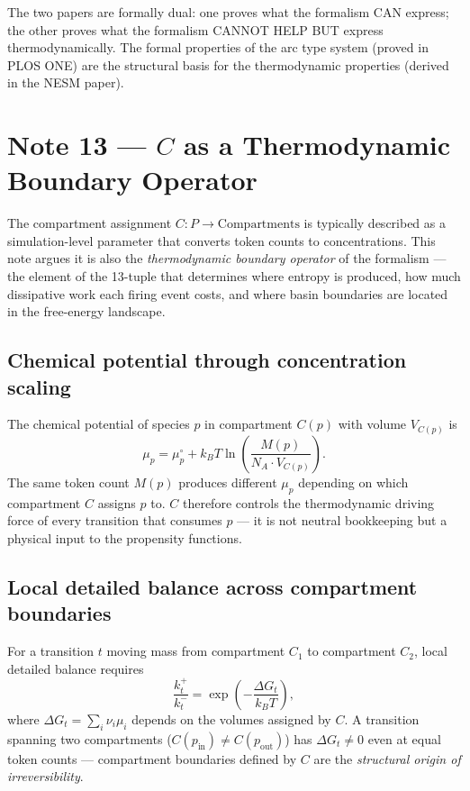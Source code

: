 \documentclass[11pt,a4paper]{article}
\begin{document}
The two papers are formally dual: one proves what the formalism CAN express;
the other proves what the formalism CANNOT HELP BUT express thermodynamically.
The formal properties of the arc type system (proved in PLOS ONE) are the
structural basis for the thermodynamic properties (derived in the NESM paper).

\section*{Note 13 — $C$ as a Thermodynamic Boundary Operator}
\label{note:C_thermodynamic}

The compartment assignment $C: P \to \text{Compartments}$ is typically
described as a simulation-level parameter that converts token counts to
concentrations.  This note argues it is also the \emph{thermodynamic boundary
operator} of the formalism --- the element of the 13-tuple that determines
where entropy is produced, how much dissipative work each firing event costs,
and where basin boundaries are located in the free-energy landscape.

\subsection*{Chemical potential through concentration scaling}

The chemical potential of species $p$ in compartment $C(p)$ with volume
$V_{C(p)}$ is
\begin{equation}
  \mu_p = \mu_p^\circ + k_BT \ln\!\left(\frac{M(p)}{N_A \cdot V_{C(p)}}\right).
  \label{eq:note13_chempot}
\end{equation}
The same token count $M(p)$ produces different $\mu_p$ depending on which
compartment $C$ assigns $p$ to.  $C$ therefore controls the thermodynamic
driving force of every transition that consumes $p$ --- it is not neutral
bookkeeping but a physical input to the propensity functions.

\subsection*{Local detailed balance across compartment boundaries}

For a transition $t$ moving mass from compartment $C_1$ to compartment $C_2$,
local detailed balance requires
\begin{equation}
  \frac{k_t^+}{k_t^-} = \exp\!\left(-\frac{\Delta G_t}{k_BT}\right),
\end{equation}
where $\Delta G_t = \sum_i \nu_i \mu_i$ depends on the volumes assigned by
$C$.  A transition spanning two compartments ($C(p_{\mathrm{in}}) \neq
C(p_{\mathrm{out}})$) has $\Delta G_t \neq 0$ even at equal token counts ---
compartment boundaries defined by $C$ are the \emph{structural origin of
irreversibility}.
\end{document}

